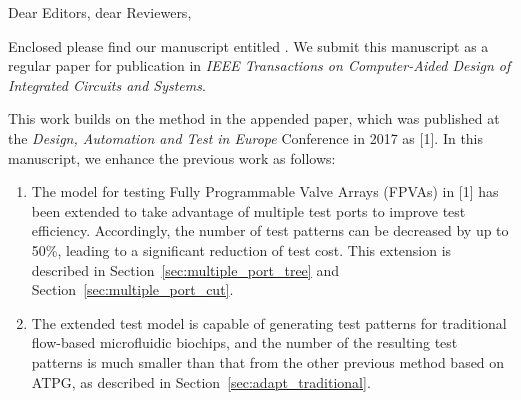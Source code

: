 \setcounter{page}{0} 



\clearpage
\thispagestyle{empty} 
\begin{table*}
\begin{center}
\begin{minipage}[t][21.5cm][t]{12.8cm}
\renewcommand{\baselinestretch}{1.2} 
\normalsize


\vspace{10pt}

Dear Editors, dear Reviewers,\\

\vspace{3pt}

Enclosed please find our manuscript entitled \textit{\papertitle}. We submit this
manuscript as a regular paper for publication in \textit{IEEE Transactions on
Computer-Aided Design of Integrated Circuits and Systems}.

\vspace{3pt}

This work builds on the method in the appended paper, which was published at the 
\textit{Design, Automation and Test in Europe} Conference in 2017 as [1].
In this manuscript, we enhance the previous work as follows: 

\vspace{3pt}

\begin{enumerate} 

  \item The model for testing Fully Programmable Valve Arrays (FPVAs) in [1] 
    has been extended to take advantage of multiple test
    ports to improve test efficiency. Accordingly, the number of test patterns
    can be decreased by up to 50\%, leading to a significant
    reduction of test cost. This extension is described in
    Section~\ref{sec:multiple_port_tree} and Section~\ref{sec:multiple_port_cut}.

  \item The extended test model is capable of generating test patterns for
    traditional flow-based microfluidic biochips, and the number of the
    resulting test patterns is much smaller than that from the other previous
    method based on ATPG, as described in Section~\ref{sec:adapt_traditional}.
   

\end{enumerate}
\end{minipage}
\end{center}
\end{table*}
